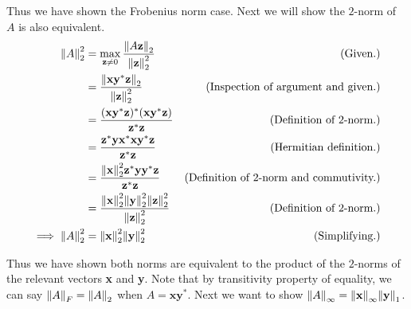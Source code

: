 \begin{solution}
    Thus we have shown the Frobenius norm case. Next we will show the $2$-norm of $A$ is also equivalent. 
    \newpage
    \alignbreak
    \begin{align}
        \norm{A}_2^2 &= \max_{\textbf{z} \neq 0}\frac{\norm{A\textbf{z}}_2}{\norm{\textbf{z}}_2^2} &\text{(Given.)}\nonumber\\ 
        &= \frac{\norm{\textbf{xy}^*\textbf{z}}_2}{\norm{\textbf{z}}_2^2} &\text{(Inspection of argument and given.)}\nonumber\\ 
        &= \frac{(\textbf{xy}^*\textbf{z})^*(\textbf{xy}^*\textbf{z})}{\textbf{z}^*\textbf{z}} &\text{(Definition of $2$-norm.)}\nonumber\\
        &= \frac{\textbf{z}^*\textbf{y}\textbf{x}^*\textbf{x}\textbf{y}^* \textbf{z}}{\textbf{z}^*\textbf{z}} &\text{(Hermitian definition.)}\nonumber\\
        &= \frac{\norm{\textbf{x}}^2_2\textbf{z}^*\textbf{y}\textbf{y}^*\textbf{z}}{\textbf{z}^*\textbf{z}} &\text{(Definition of $2$-norm and commutivity.)}\nonumber\\
        &= \frac{\norm{\textbf{x}}^2_2\norm{\textbf{y}}^2_2\norm{\textbf{z}}^2_2}{\norm{\textbf{z}}_2^2} &\text{(Definition of $2$-norm.)}\nonumber\\
       \implies \norm{A}_2^2  &= \norm{\textbf{x}}_2^2\norm{\textbf{y}}_2^2 &\text{(Simplifying.)}\nonumber
    \end{align}
    \alignbreak

    Thus we have shown both norms are equivalent to the product of the $2$-norms of the relevant vectors \textbf{x}  and \textbf{y}. Note that by transitivity property of equality, we can say $\norm{A}_F = \norm{A}_2$ when $A = \textbf{x}\textbf{y}^*$. Next we want to show $\norm{A}_\infty = \norm{\textbf{x}}_\infty \norm{\textbf{y}}_1$. 


\end{solution}
